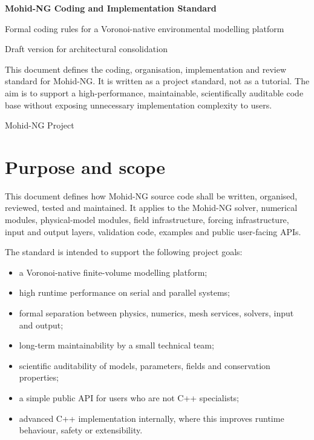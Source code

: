 \documentclass[11pt,a4paper]{article}
\begin{document}

\begin{titlepage}
  \centering
  \vspace*{2.0cm}
  {\Huge\bfseries\color{mohidblue} Mohid-NG Coding and Implementation Standard\par}
  \vspace{0.7cm}
  {\Large Formal coding rules for a Voronoi-native environmental modelling platform\par}
  \vspace{1.5cm}
  {\large Draft version for architectural consolidation\par}
  \vfill
  \begin{minipage}{0.86\textwidth}
  \small
  This document defines the coding, organisation, implementation and review standard for Mohid-NG. It is written as a project standard, not as a tutorial. The aim is to support a high-performance, maintainable, scientifically auditable code base without exposing unnecessary implementation complexity to users.
  \end{minipage}
  \vfill
  {\large Mohid-NG Project\par}
\end{titlepage}

\tableofcontents
\newpage
{}

\section{Purpose and scope}

This document defines how Mohid-NG source code shall be written, organised, reviewed, tested and maintained. It applies to the Mohid-NG solver, numerical modules, physical-model modules, field infrastructure, forcing infrastructure, input and output layers, validation code, examples and public user-facing APIs.

The standard is intended to support the following project goals:

\begin{itemize}
  \item a Voronoi-native finite-volume modelling platform;
  \item high runtime performance on serial and parallel systems;
  \item formal separation between physics, numerics, mesh services, solvers, input and output;
  \item long-term maintainability by a small technical team;
  \item scientific auditability of models, parameters, fields and conservation properties;
  \item a simple public API for users who are not C++ specialists;
  \item advanced C++ implementation internally, where this improves runtime behaviour, safety or extensibility.
\end{itemize}
\end{document}
